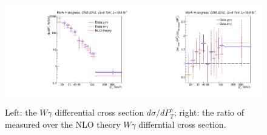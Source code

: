 \begin{figure}[htb]
  \begin{center}
   \includegraphics[width=0.5\textwidth]{../figs/figs_v11/ChannelsMERGED_WGamma/CrossSection/compareCSWGamma.pdf}\includegraphics[width=0.5\textwidth]{../figs/figs_v11/ChannelsMERGED_WGamma/CrossSection/compareCSratioTheoryWGamma.pdf}
  \caption{Left: the $W\gamma$ differential cross section $d\sigma/dP_T^{\gamma}$; right: the ratio of measured over the NLO theory $W\gamma$ differntial cross section. }
  \label{fig:CS_Wg}
 \end{center}
\end{figure}



